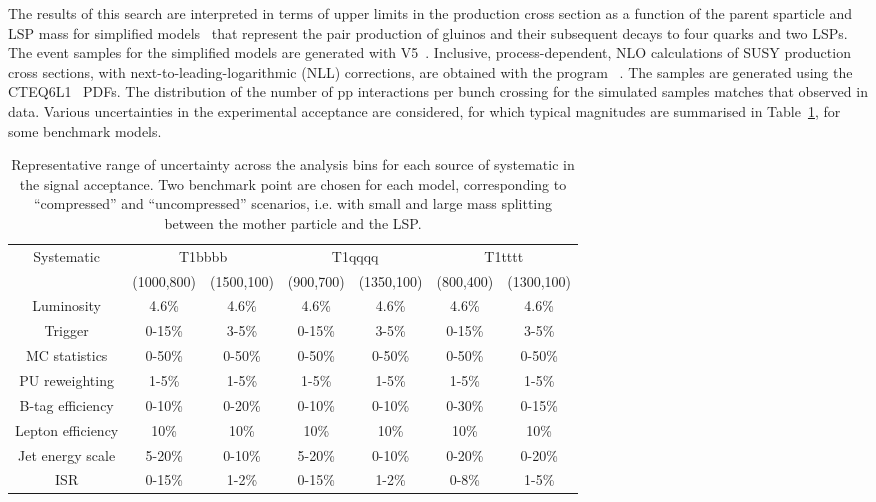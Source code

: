 The results of this search are interpreted in terms of upper limits in
the production cross section as a function of the parent sparticle and
LSP mass for simplified models~\cite{Alwall:2008ag, Alwall:2008va,
  sms} that represent the pair production of gluinos and their
subsequent decays to four quarks and two LSPs. The event samples for
the simplified models are generated with \MADGRAPH V5~\cite{madgraph}.
Inclusive, process-dependent, NLO calculations of SUSY production
cross sections, with next-to-leading-logarithmic (NLL) corrections,
are obtained with the program \PROSPINO~\cite{Beenakker:1996ch,
  PhysRevD.80.095004,PhysRevLett.102.111802, PhysRevD.80.095004,
  1126-6708-2009-12-041, doi:10.1142/S0217751X11053560,
  susy-nlo-nll}. The samples are generated using the
CTEQ6L1~\cite{Pumplin:2002vw} PDFs. The distribution of the number of
pp interactions per bunch crossing for the simulated samples matches
that observed in data. Various uncertainties in the experimental
acceptance are considered, for which typical magnitudes are summarised
in Table~\ref{tab:signal_systs}, for some benchmark models. 

\begin{table}[h!]
  \caption{Representative range of uncertainty across the analysis bins 
    for each source of systematic in the signal acceptance. 
    Two benchmark point are chosen for each model, 
    corresponding to ``compressed'' and ``uncompressed'' scenarios, 
    i.e. with small and large mass splitting between the mother particle and the LSP.
  }
  \label{tab:signal_systs}
  \centering
  \begin{tabular}{ ccccccc }
    \hline
    \hline
    Systematic & \multicolumn{2}{c}{T1bbbb} & \multicolumn{2}{c}{T1qqqq} & \multicolumn{2}{c}{T1tttt}  \\ 
                      & (1000,800) & (1500,100) & (900,700) & (1350,100) & (800,400) & (1300,100) \\
    \hline
    Luminosity        & 4.6\%      & 4.6\%      & 4.6\%     & 4.6\%   & 4.6\%      & 4.6\%     \\ \hline
    Trigger           & 0-15\%     & 3-5\%      & 0-15\%    & 3-5\%   & 0-15\%     & 3-5\%     \\ \hline
    MC statistics     & 0-50\%     & 0-50\%     & 0-50\%    & 0-50\%  & 0-50\%     & 0-50\%    \\ \hline
    PU reweighting    & 1-5\%      & 1-5\%      & 1-5\%     & 1-5\%   & 1-5\%      & 1-5\%     \\ \hline
    B-tag efficiency  & 0-10\%     & 0-20\%     & 0-10\%    & 0-10\%  & 0-30\%     & 0-15\%    \\ \hline
    Lepton efficiency & 10\%       & 10\%       & 10\%      & 10\%    & 10\%       & 10\%      \\ \hline
    Jet energy scale  & 5-20\%     & 0-10\%     & 5-20\%    & 0-10\%  & 0-20\%     & 0-20\%    \\ \hline
    ISR               & 0-15\%     & 1-2\%      & 0-15\%    & 1-2\%   & 0-8\%     & 1-5\%     \\
    \hline
    \hline
  \end{tabular}
\end{table}


